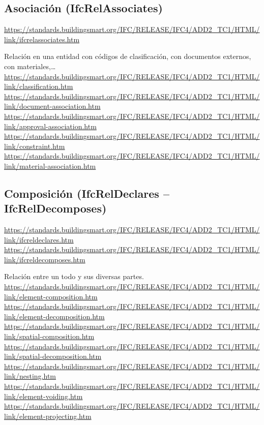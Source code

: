 \documentclass[spanish,12pt,a4paper,final,oneside]{book}
\begin{document}
\subsection{Asociación (IfcRelAssociates)}
\url{https://standards.buildingsmart.org/IFC/RELEASE/IFC4/ADD2_TC1/HTML/link/ifcrelassociates.htm}

Relación en una entidad con códigos de clasificación, con documentos externos, con materiales,\ldots
\\ \url{https://standards.buildingsmart.org/IFC/RELEASE/IFC4/ADD2_TC1/HTML/link/classification.htm}
\\ \url{https://standards.buildingsmart.org/IFC/RELEASE/IFC4/ADD2_TC1/HTML/link/document-association.htm}
\\ \url{https://standards.buildingsmart.org/IFC/RELEASE/IFC4/ADD2_TC1/HTML/link/approval-association.htm}
\\ \url{https://standards.buildingsmart.org/IFC/RELEASE/IFC4/ADD2_TC1/HTML/link/constraint.htm}
\\ \url{https://standards.buildingsmart.org/IFC/RELEASE/IFC4/ADD2_TC1/HTML/link/material-association.htm}



\subsection{Composición (IfcRelDeclares -- IfcRelDecomposes)}
\url{https://standards.buildingsmart.org/IFC/RELEASE/IFC4/ADD2_TC1/HTML/link/ifcreldeclares.htm}
\\ \url{https://standards.buildingsmart.org/IFC/RELEASE/IFC4/ADD2_TC1/HTML/link/ifcreldecomposes.htm}

Relación entre un todo y sus diversas partes.
\\ \url{https://standards.buildingsmart.org/IFC/RELEASE/IFC4/ADD2_TC1/HTML/link/element-composition.htm}
\\ \url{https://standards.buildingsmart.org/IFC/RELEASE/IFC4/ADD2_TC1/HTML/link/element-decomposition.htm}
\\ \url{https://standards.buildingsmart.org/IFC/RELEASE/IFC4/ADD2_TC1/HTML/link/spatial-composition.htm}
\\ \url{https://standards.buildingsmart.org/IFC/RELEASE/IFC4/ADD2_TC1/HTML/link/spatial-decomposition.htm}
\\ \url{https://standards.buildingsmart.org/IFC/RELEASE/IFC4/ADD2_TC1/HTML/link/nesting.htm}
\\ \url{https://standards.buildingsmart.org/IFC/RELEASE/IFC4/ADD2_TC1/HTML/link/element-voiding.htm}
\\ \url{https://standards.buildingsmart.org/IFC/RELEASE/IFC4/ADD2_TC1/HTML/link/element-projecting.htm}
\end{document}
